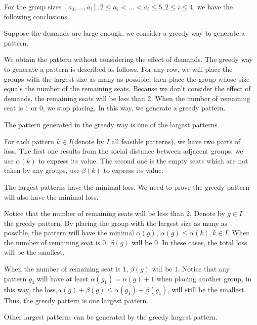 For the group sizes $[a_1,\ldots,a_i], 2 \leq a_1<\ldots<a_i \leq 5, 2 \leq i \leq 4$, we have the following conclusions.

Suppose the demands are large enough, we consider a greedy way to generate a pattern.

\begin{definition}
We obtain the pattern without considering the effect of demands. The greedy way to generate a pattern is described as follows.
For any row, we will place the groups with the largest size as many as possible, then place the group whose size equals the number of the remaining seats. Because we don't consider the effect of demands, the remaining seats will be less than $2$. When the number of remaining seat is $1$ or $0$, we stop placing. In this way, we generate a greedy pattern.
\end{definition}

\begin{lem}\label{largest}
The pattern generated in the greedy way is one of the largest patterns.
\end{lem}

\begin{pf}
For each pattern $k \in I$(denote by $I$ all feasible patterns), we have two parts of loss. The first one results from the social distance between adjacent groups, we use $\alpha(k)$ to express its value. The second one is the empty seats which are not taken by any groups, use $\beta(k)$ to express its value.

The largest patterns have the minimal loss. We need to prove the greedy pattern will also have the minimal loss.

Notice that the number of remaining seats will be less than 2. Denote by $g \in I$ the greedy pattern. By placing the group with the largest size as many as possible, the pattern will have the minimal $\alpha(g)$, $\alpha(g) \leq \alpha(k), k \in I$. When the number of remaining seat is $0$, $\beta(g)$ will be 0. In these cases, the total loss will be the smallest.

When the number of remaining seat is $1$, $\beta(g)$ will be 1. Notice that any pattern $g_1$ will have at least $\alpha(g_1) = \alpha(g)+1$ when placing another group, in this way, the loss,$\alpha(g) + \beta(g) \leq \alpha(g_1)+\beta(g_1)$, will still be the smallest.
Thus, the greedy pattern is one largest pattern.
\end{pf}

\begin{lem}
Other largest patterns can be generated by the greedy largest pattern.
\end{lem}


